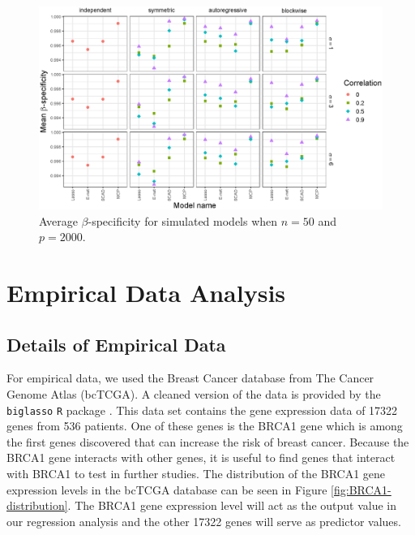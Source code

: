 \documentclass{article}
\begin{document}
\begin{figure}[t!]
	\centering
	\includegraphics[width = \textwidth]{images/facet-specificity/facet_specificity_50_2000.eps}
	\captionsetup{width = 0.8\textwidth}
	\caption{Average $\beta$-specificity for simulated models when $n = 50$ and $p = 2000$.}
	\label{fig:specificity-50-2000}
\end{figure}

\section{Empirical Data Analysis}
\subsection{Details of Empirical Data}

For empirical data, we used the Breast Cancer database from The Cancer Genome Atlas (bcTCGA). A cleaned version of the data is provided by the \lstinline!biglasso! \lstinline!R! package \cite{zeng2017biglasso}. This data set contains the gene expression data of 17322 genes from 536 patients. One of these genes is the BRCA1 gene which is among the first genes discovered that can increase the risk of breast cancer. Because the BRCA1 gene interacts with other genes, it is useful to find genes that interact with BRCA1 to test in further studies. The distribution of the BRCA1 gene expression levels in the bcTCGA database can be seen in Figure \ref{fig:BRCA1-distribution}. The BRCA1 gene expression level will act as the output value in our regression analysis and the other 17322 genes will serve as predictor values.
\end{document}

